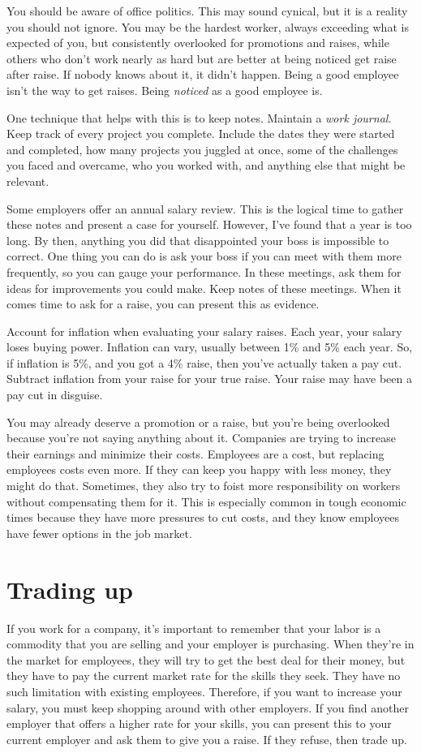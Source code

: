 You should be aware of office politics. This may sound cynical, but it is a reality you should not ignore. You may be the hardest worker, always exceeding what is expected of you, but consistently overlooked for promotions and raises, while others who don't work nearly as hard but are better at being noticed get raise after raise. If nobody knows about it, it didn't happen. Being a good employee isn't the way to get raises. Being \emph{noticed} as a good employee is.

One technique that helps with this is to keep notes. Maintain a \emph{work journal.} Keep track of every project you complete. Include the dates they were started and completed, how many projects you juggled at once, some of the challenges you faced and overcame, who you worked with, and anything else that might be relevant.

Some employers offer an annual salary review. This is the logical time to gather these notes and present a case for yourself. However, I've found that a year is too long. By then, anything you did that disappointed your boss is impossible to correct. One thing you can do is ask your boss if you can meet with them more frequently, so you can gauge your performance. In these meetings, ask them for ideas for improvements you could make. Keep notes of these meetings. When it comes time to ask for a raise, you can present this as evidence.

Account for inflation when evaluating your salary raises. Each year, your salary loses buying power. Inflation can vary, usually between 1\% and 5\% each year. So, if inflation is 5\%, and you got a 4\% raise, then you've actually taken a pay cut. Subtract inflation from your raise for your true raise. Your raise may have been a pay cut in disguise.

You may already deserve a promotion or a raise, but you're being overlooked because you're not saying anything about it. Companies are trying to increase their earnings and minimize their costs. Employees are a cost, but replacing employees costs even more. If they can keep you happy with less money, they might do that. Sometimes, they also try to foist more responsibility on workers without compensating them for it. This is especially common in tough economic times because they have more pressures to cut costs, and they know employees have fewer options in the job market.

\section{Trading up}
If you work for a company, it's important to remember that your labor is a commodity that you are selling and your employer is purchasing. When they're in the market for employees, they will try to get the best deal for their money, but they have to pay the current market rate for the skills they seek. They have no such limitation with existing employees. Therefore, if you want to increase your salary, you must keep shopping around with other employers. If you find another employer that offers a higher rate for your skills, you can present this to your current employer and ask them to give you a raise. If they refuse, then trade up.

